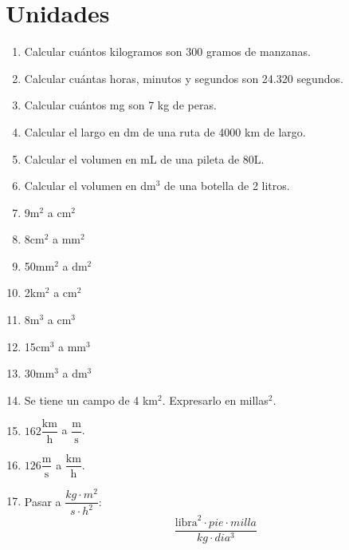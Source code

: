 \section{Unidades}

\begin{enumerate}
\item Calcular cuántos kilogramos son  300 gramos de manzanas.

\item Calcular cuántas horas, minutos y segundos son 24.320 segundos.

\item Calcular cuántos mg son 7 kg de peras.

\item Calcular el largo en dm de una ruta de 4000 km de largo.

\item Calcular el volumen en mL de una pileta de 80L.

\item Calcular el volumen en dm$^3$ de una botella de 2 litros.

\item 9m$^2$ a cm$^2$

\item 8cm$^2$ a mm$^2$

\item 50mm$^2$ a dm$^2$

\item 2km$^2$ a cm$^2$

\item 8m$^3$ a cm$^3$

\item 15cm$^3$ a mm$^3$

\item 30mm$^3$ a dm$^3$

\item Se tiene un campo de 4 km$^2$. Expresarlo en millas$^2$.

\item $162 \dfrac{\text{km}}{\text{h}}$ a $\dfrac{\text{m}}{\text{s}}$.

\item $126 \dfrac{\text{m}}{\text{s}}$ a $\dfrac{\text{km}}{\text{h}}$.


\item Pasar a $\dfrac{kg \cdot m^2}{s\cdot h^2}$:
$$
\dfrac{\text{libra}^2 \cdot pie \cdot milla}{kg \cdot dia^3}
$$
\end{enumerate}
